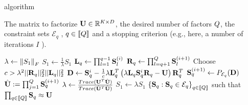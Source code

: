 \begin{algorithm}
	\caption{\palm algorithm}
	\label{algo:palm4msa}
	\begin{algorithmic}[1]
		
		\REQUIRE The matrix to factorize ${\mathbf{U}} \in \mathbb{R}^{K \times D}$, the desired number of factors $Q$, the constraint sets $\mathcal{E}_q$ , $q\in \left \llbracket Q\right \rrbracket$ and a stopping criterion (e.g., here, a number of iterations $I$ ).
		
		\STATE $\lambda \leftarrow \left \| S_1\right \|_F$
		\label{line:palm:init:lambda}
		\STATE $S_1 \leftarrow \frac{1}{\lambda} S_1$
		\label{line:palm:normalize:S1}
		\STATE  ${\mathbf{L}}_q \leftarrow \prod_{l=1}^{q-1} {\mathbf{S}}_{l}^{(i)}$
		\label{line:palm:L}
		\STATE  ${\mathbf{R}}_q \leftarrow \prod_{l=q+1}^{Q} {\mathbf{S}}_{l}^{(i+1)}$
		\label{line:palm:R}
		\STATE Choose $c > \lambda^2 ||{\mathbf{R}}_q||_2^2 ||{\mathbf{L}}_q||_2^2$
		\label{line:palm:c}
		\STATE ${\mathbf{D}} \leftarrow {\mathbf{S}}_q^i - \frac{1}{c} \lambda {\mathbf{L}}_q^T\left (\lambda{\mathbf{L}}_q {\mathbf{S}}_q^i {\mathbf{R}}_q - {\mathbf{U}}\right ){\mathbf{R}}_q^T$
		\label{line:palm:D}
		\STATE ${\mathbf{S}}^{(i+1)}_q \leftarrow P_{\mathcal{E}_q}({\mathbf{D}})$
		\label{line:palm:update:S}
		\ENDFOR
		\STATE $\hat {{\mathbf{U}}} := \prod_{j=1}^{Q} {\mathbf{S}}_q^{(i+1)}$
		\label{line:palm:U}
		\STATE $\lambda \leftarrow \frac{Trace({\mathbf{U}}^T\hat{{\mathbf{U}}})}{Trace(\hat{{\mathbf{U}}}^T\hat{{\mathbf{U}}})}$
		\label{line:palm:update:lambda}
		\ENDFOR
		\STATE $S_1 \leftarrow \lambda S_1$
		\label{line:palm:postprocess:S1}
		\ENSURE $\left \lbrace {\mathbf{S}}_q : {\mathbf{S}}_q \in \mathcal{E}_q\right \rbrace_{q\in\left \llbracket Q\right \rrbracket}$ such that $\prod_{q\in\left \llbracket Q\right \rrbracket}{\mathbf{S}}_q \approx {\mathbf{U}}$
		
	\end{algorithmic}
\end{algorithm}

